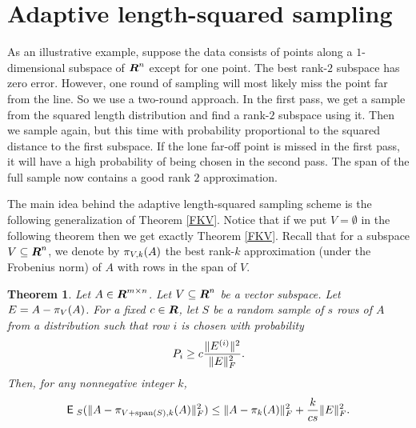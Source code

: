 \documentclass{book}
\newtheorem{theorem}{Theorem}[chapter]
\numberwithin{exercise}{chapter}
\begin{document}

\section{Adaptive length-squared sampling}\label{sec:pass-eff}


As an illustrative example, suppose the
data consists of points along a $1$-dimensional subspace of $\mbox{\mbox{\boldmath $R$}}^n$
except for one point. The best rank-$2$ subspace has zero error.
However, one round of sampling will most likely miss the point far
from the line. So we use a two-round approach. In the first pass,
we get a sample from the squared length distribution and find a
rank-$2$ subspace using it. Then we sample again, but this time
with probability proportional to the squared distance to the first
subspace. If the lone far-off point is missed in the first pass,
it will have a high probability of being chosen in the second
pass. The span of the full sample now contains a good rank $2$
approximation.

The main idea behind the adaptive length-squared sampling scheme is the following
generalization of Theorem \ref{FKV}. Notice that if we put $V =
\emptyset$ in the following theorem then we get exactly Theorem
\ref{FKV}. Recall that for a subspace $V \subseteq \mbox{\mbox{\boldmath $R$}}^n$, we denote by $\pi_{V,k}(A)$ the best rank-$k$ approximation (under the Frobenius norm) of $A$ with rows
in the span of $V$.

\begin{theorem}\label{thm:tworounds}
Let $A \in \mbox{\mbox{\boldmath $R$}}^{m \times n}$. Let $V \subseteq \mbox{\mbox{\boldmath $R$}}^n$ be a vector
subspace. Let $E = A - \pi_V(A)$. For a fixed $c \in \mbox{\mbox{\boldmath $R$}}$, let
$S$ be a random sample of $s$ rows of $A$ from a distribution such
that row $i$ is chosen with probability
\begin{equation}\label{equ:hypothesisPi}
    P_i \geq c \frac{\|E^{(i)}\|^2}{\|E\|_{F}^2}.
\end{equation}
Then, for any nonnegative integer $k$,
\[
\hbox{{\sf E}\;}_S(\|A-\pi_{V + \operatorname{span}(S),k}(A)\|_{F}^2) \leq
\|A-\pi_k(A)\|_{F}^2 + \frac{k}{cs} \|E\|_{F}^2.
\]
\end{theorem}
\end{document}
